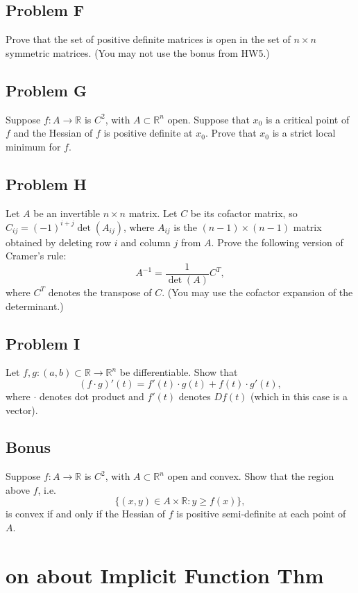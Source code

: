 \documentclass[lang=cn,11pt]{template}
\begin{document}
\section*{Problem F}
Prove that the set of positive definite matrices is open in the set of $n \times n$ symmetric matrices. (You may not use the bonus from HW5.)

\section*{Problem G}
Suppose $f : A \to \mathbb{R}$ is $C^2$, with $A \subset \mathbb{R}^n$ open. Suppose that $x_0$ is a critical point of $f$ and the Hessian of $f$ is positive definite at $x_0$. Prove that $x_0$ is a strict local minimum for $f$.

\section*{Problem H}
Let $A$ be an invertible $n \times n$ matrix. Let $C$ be its cofactor matrix, so $C_{ij} = (-1)^{i+j} \det(A_{ij})$, where $A_{ij}$ is the $(n-1) \times (n-1)$ matrix obtained by deleting row $i$ and column $j$ from $A$. Prove the following version of Cramer's rule:
\[
A^{-1} = \frac{1}{\det(A)} C^T,
\]
where $C^T$ denotes the transpose of $C$. (You may use the cofactor expansion of the determinant.)

\section*{Problem I}
Let $f, g : (a, b) \subset \mathbb{R} \to \mathbb{R}^n$ be differentiable. Show that
\[
(f \cdot g)'(t) = f'(t) \cdot g(t) + f(t) \cdot g'(t),
\]
where $\cdot$ denotes dot product and $f'(t)$ denotes $Df(t)$ (which in this case is a vector).

\section*{Bonus}
Suppose $f : A \to \mathbb{R}$ is $C^2$, with $A \subset \mathbb{R}^n$ open and convex. Show that the region above $f$, i.e.
\[
\{(x, y) \in A \times \mathbb{R} : y \geq f(x)\},
\]
is convex if and only if the Hessian of $f$ is positive semi-definite at each point of $A$.




\chapter{on about Implicit Function Thm}
\end{document}
